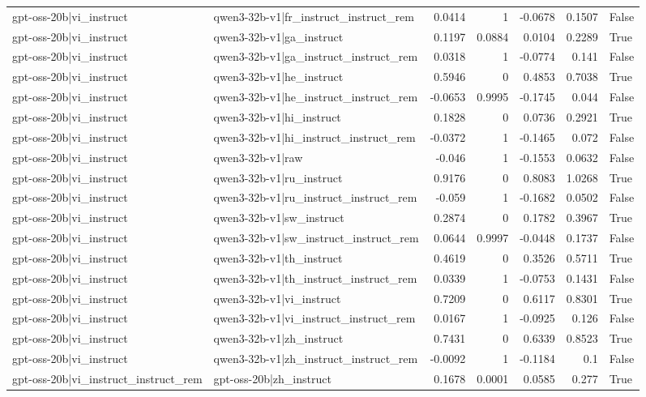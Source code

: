\begin{table}
\begin{tabular}{l l r r r r l}
gpt-oss-20b|vi_instruct & qwen3-32b-v1|fr_instruct_instruct_rem & 0.0414 & 1 & -0.0678 & 0.1507 & False \\
gpt-oss-20b|vi_instruct & qwen3-32b-v1|ga_instruct & 0.1197 & 0.0884 & 0.0104 & 0.2289 & True \\
gpt-oss-20b|vi_instruct & qwen3-32b-v1|ga_instruct_instruct_rem & 0.0318 & 1 & -0.0774 & 0.141 & False \\
gpt-oss-20b|vi_instruct & qwen3-32b-v1|he_instruct & 0.5946 & 0 & 0.4853 & 0.7038 & True \\
gpt-oss-20b|vi_instruct & qwen3-32b-v1|he_instruct_instruct_rem & -0.0653 & 0.9995 & -0.1745 & 0.044 & False \\
gpt-oss-20b|vi_instruct & qwen3-32b-v1|hi_instruct & 0.1828 & 0 & 0.0736 & 0.2921 & True \\
gpt-oss-20b|vi_instruct & qwen3-32b-v1|hi_instruct_instruct_rem & -0.0372 & 1 & -0.1465 & 0.072 & False \\
gpt-oss-20b|vi_instruct & qwen3-32b-v1|raw & -0.046 & 1 & -0.1553 & 0.0632 & False \\
gpt-oss-20b|vi_instruct & qwen3-32b-v1|ru_instruct & 0.9176 & 0 & 0.8083 & 1.0268 & True \\
gpt-oss-20b|vi_instruct & qwen3-32b-v1|ru_instruct_instruct_rem & -0.059 & 1 & -0.1682 & 0.0502 & False \\
gpt-oss-20b|vi_instruct & qwen3-32b-v1|sw_instruct & 0.2874 & 0 & 0.1782 & 0.3967 & True \\
gpt-oss-20b|vi_instruct & qwen3-32b-v1|sw_instruct_instruct_rem & 0.0644 & 0.9997 & -0.0448 & 0.1737 & False \\
gpt-oss-20b|vi_instruct & qwen3-32b-v1|th_instruct & 0.4619 & 0 & 0.3526 & 0.5711 & True \\
gpt-oss-20b|vi_instruct & qwen3-32b-v1|th_instruct_instruct_rem & 0.0339 & 1 & -0.0753 & 0.1431 & False \\
gpt-oss-20b|vi_instruct & qwen3-32b-v1|vi_instruct & 0.7209 & 0 & 0.6117 & 0.8301 & True \\
gpt-oss-20b|vi_instruct & qwen3-32b-v1|vi_instruct_instruct_rem & 0.0167 & 1 & -0.0925 & 0.126 & False \\
gpt-oss-20b|vi_instruct & qwen3-32b-v1|zh_instruct & 0.7431 & 0 & 0.6339 & 0.8523 & True \\
gpt-oss-20b|vi_instruct & qwen3-32b-v1|zh_instruct_instruct_rem & -0.0092 & 1 & -0.1184 & 0.1 & False \\
gpt-oss-20b|vi_instruct_instruct_rem & gpt-oss-20b|zh_instruct & 0.1678 & 0.0001 & 0.0585 & 0.277 & True \\

\end{tabular}
\end{table}
